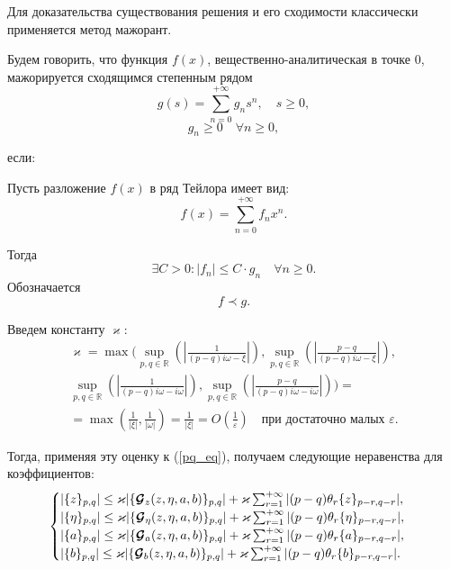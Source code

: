 Для доказательства существования решения и его сходимости классически применяется метод мажорант.

\begin{dfn}

Будем говорить, что функция $f(x)$, вещественно-аналитическая в точке 0, мажорируется сходящимся степенным рядом 
$$g(s) = \sum_{n=0}^{+\infty} g_n s^n, \quad s \ge 0 ,$$
$$g_n \ge 0 \quad \forall n \ge 0,$$

если:

\quad Пусть разложение $f(x)$ в ряд Тейлора имеет вид:
$$f(x) = \sum_{n=0}^{+\infty} f_n x^n.$$ 

\quad Тогда
$$\exists C>0: |f_n| \leq C \cdot g_n \quad \forall n \geq 0.$$
Обозначается
$$ f \prec g.$$


\end{dfn}


Введем константу $\varkappa$:
\begin{multline*}
\varkappa = \max \Bigg( 
\sup_{p,q \in \mathbb{R}}\left( \left|\frac{1}{(p-q)i \omega - \xi} \right| \right), 
\sup_{p,q \in \mathbb{R}}\left( \left|\frac{p-q}{(p-q)i \omega - \xi} \right| \right),\\
\sup_{p,q \in \mathbb{R}}\left( \left|\frac{1}{(p-q)i \omega - i\omega} \right| \right), 
\sup_{p,q \in \mathbb{R}}\left( \left|\frac{p-q}{(p-q)i \omega - i\omega} \right| \right) \Bigg) = \\
= \max(\frac{1}{|\xi|}, \frac{1}{|\omega|}) = \frac{1}{|\xi|} = O \left( \frac{1}{\varepsilon} \right) \quad \text{при достаточно малых $\varepsilon$}.
\end{multline*}

Тогда, применяя эту оценку к (\ref{pq_eq}), получаем следующие неравенства для коэффициентов:
\begin{equation}
\begin{cases}
|\{z\}_{p,q}| \le \varkappa |\{\boldsymbol{\mathcal{G}}_z(z,\eta,a,b)\}_{p,q}| + \varkappa \sum_{r=1}^{+\infty}|{(p-q)\theta_r \{z\}_{p-r,q-r}}|, \\
|\{\eta\}_{p,q}| \le \varkappa |\{\boldsymbol{\mathcal{G}}_\eta(z,\eta,a,b)\}_{p,q}| + \varkappa \sum_{r=1}^{+\infty}|{(p-q)\theta_r \{\eta\}_{p-r,q-r}}|, \\
|\{a\}_{p,q}| \le \varkappa |\{\boldsymbol{\mathcal{G}}_a(z,\eta,a,b)\}_{p,q}| + \varkappa \sum_{r=1}^{+\infty}|{(p-q)\theta_r \{a\}_{p-r,q-r}}|, \\
|\{b \}_{p,q}| \le \varkappa |\{\boldsymbol{\mathcal{G}}_b(z,\eta,a,b)\}_{p,q}| + \varkappa \sum_{r=1}^{+\infty}|{(p-q)\theta_r \{b\}_{p-r,q-r}}|.
\end{cases}
\label{ineq_1}
\end{equation}

